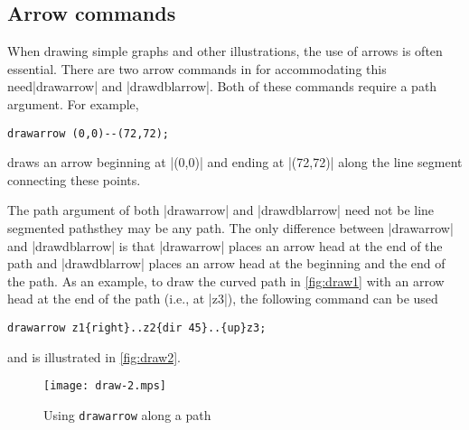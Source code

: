 \subsection{Arrow commands}

When drawing simple graphs and other illustrations, the use of arrows is
often essential.  There are two arrow commands in \MP{} for
accommodating this need\Dash |drawarrow| and |drawdblarrow|.  Both of
these commands require a path argument.  For example,

\begin{lstlisting}[style=MP]
drawarrow (0,0)--(72,72);
\end{lstlisting}
draws an arrow beginning at |(0,0)| and ending at |(72,72)| along the
line segment connecting these points.

The path argument of both |drawarrow| and |drawdblarrow| need not be
line segmented paths\Dash they may be any \MP{} path.  The only
difference between |drawarrow| and |drawdblarrow| is that |drawarrow|
places an arrow head at the end of the path and |drawdblarrow| places an
arrow head at the beginning and the end of the path.  As an example, to
draw the curved path in \autoref{fig:draw1} with an arrow head at the
end of the path (i.e., at |z3|), the following command can be used

\begin{lstlisting}[style=MP]
drawarrow z1{right}..z2{dir 45}..{up}z3;
\end{lstlisting}
and is illustrated in \autoref{fig:draw2}.

\begin{figure}
  \centering
  \texttt{[image: draw-2.mps]}
  \caption{Using \texttt{drawarrow} along a path}
  \label{fig:draw2}
\end{figure}
